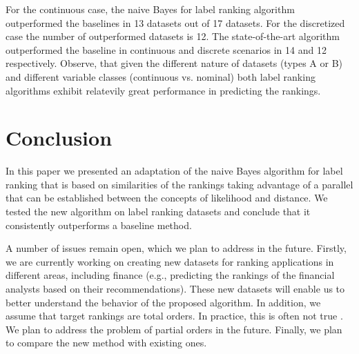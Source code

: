 For the continuous case, the naive Bayes for label ranking algorithm outperformed the baselines in 13 datasets out of 17 datasets. For the discretized case the number of outperformed datasets is 12. The state-of-the-art algorithm outperformed the baseline in continuous and discrete scenarios in 14 and 12 respectively. Observe, that given the different nature of datasets (types A or B) and different variable classes (continuous vs. nominal) both label ranking algorithms exhibit relatevily great performance in predicting the rankings.


\section{Conclusion}
\label{ch2-sec:conclusion}


In this paper we presented an adaptation of the naive Bayes algorithm for label ranking that is based on similarities of the rankings taking advantage of a parallel that can be established between the concepts of likelihood and distance. We tested the new algorithm on label ranking datasets and conclude that it consistently outperforms a baseline method.

A number of issues remain open, which we plan to address in the future. Firstly, we are currently working on creating new datasets for ranking applications in different areas, including finance (e.g., predicting the rankings of the financial analysts based on their recommendations). These new datasets will enable us to better understand the behavior of the proposed algorithm. In addition, we assume that target rankings are total orders. In practice, this is often not true \citep{cheng2010,brazdil2003}. We plan to address the problem of partial orders in the future.  Finally, we plan to compare the new method with existing ones.


